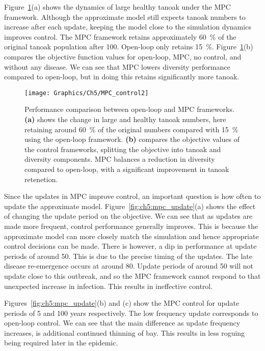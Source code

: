 Figure~\ref{fig:ch5:mpc_performance}(a) shows the dynamics of large healthy tanoak under the MPC framework. Although the approximate model still expects tanoak numbers to increase after each update, keeping the model close to the simulation dynamics improves control. The MPC framework retains approximately \SI{60}{\percent} of the original tanoak population after \SI{100}{\years}. Open-loop only retains \SI{15}{\percent}. Figure~\ref{fig:ch5:mpc_performance}(b) compares the objective function values for open-loop, MPC, no control, and without any disease. We can see that MPC lowers diversity performance compared to open-loop, but in doing this retains significantly more tanoak.

\begin{figure}[t]
    \begin{center}
        \texttt{[image: Graphics/Ch5/MPC\_control2]}
        \caption[MPC strategy performance]{Performance comparison between open-loop and MPC frameworks. \textbf{(a)} shows the change in large and healthy tanoak numbers, here retaining around \SI{60}{\percent} of the original numbers compared with \SI{15}{\percent} using the open-loop framework. \textbf{(b)} compares the objective values of the control frameworks, splitting the objective into tanoak and diversity components. MPC balances a reduction in diversity compared to open-loop, with a significant improvement in tanoak retenetion.\label{fig:ch5:mpc_performance}}
    \end{center}
\end{figure}

Since the updates in MPC improve control, an important question is how often to update the approximate model. Figure~\ref{fig:ch5:mpc_update}(a) shows the effect of changing the update period on the objective. We can see that as updates are made more frequent, control performance generally improves. This is because the approximate model can more closely match the simulation and hence appropriate control decisions can be made. There is however, a dip in performance at update periods of around \SI{50}{\years}. This is due to the precise timing of the updates. The late disease re-emergence occurs at around \SI{80}{\years}. Update periods of around \SI{50}{\years} will not update close to this outbreak, and so the MPC framework cannot respond to that unexpected increase in infection. This results in ineffective control.

Figures~\ref{fig:ch5:mpc_update}(b) and (c) show the MPC control for update periods of 5 and 100 years respectively. The low frequency update corresponds to open-loop control. We can see that the main difference as update frequency increases, is additional continued thinning of bay. This results in less roguing being required later in the epidemic.

